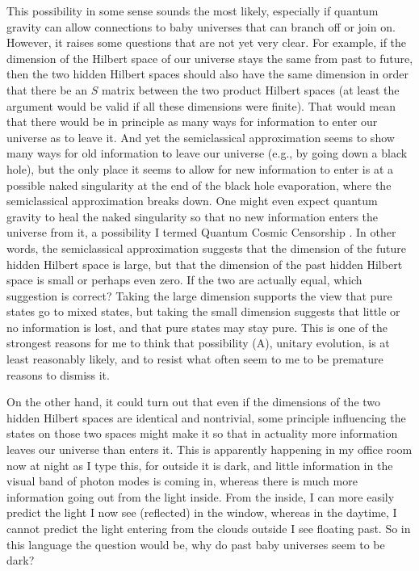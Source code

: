 \documentclass[12pt]{article}
\begin{document}
     This possibility in some sense sounds the most likely,
especially if
quantum gravity can allow connections to baby universes that can
branch off or
join on.  However, it raises some questions that are not yet very
clear.  For
example, if the dimension of the Hilbert space of our universe stays
the same
from past to future, then the two hidden Hilbert spaces should also
have the
same dimension in order that there be an $S$ matrix between the two
product
Hilbert spaces (at least the argument would be valid if all these
dimensions
were finite).  That would mean that there would be in principle as
many ways
for information to enter our universe as to leave it.  And yet the
semiclassical approximation seems to show many ways for old
information to
leave our universe (e.g., by going down a black hole), but the only
place it
seems to allow for new information to enter is at a possible naked
singularity
at the end of the black hole evaporation, where the semiclassical
approximation
breaks down.  One might even expect quantum gravity to heal the naked
singularity so that no new information enters the universe from it, a
possibility
I termed Quantum Cosmic Censorship \cite{Pag80}.  In other
words, the semiclassical approximation suggests that the dimension of
the
future hidden Hilbert space is large, but that the dimension of the
past hidden
Hilbert space is small or perhaps even zero.  If the two are actually
equal,
which suggestion is correct?  Taking the large dimension supports the
view that
pure states go to mixed states, but taking the small dimension
suggests that
little or no information is lost, and that pure states may stay pure.
This is
one of the strongest reasons for me to think that possibility (A),
unitary
evolution, is at least reasonably likely, and to resist what often
seem to me
to be premature reasons to dismiss it.

     On the other hand, it could turn out that even if the dimensions
of the
two hidden Hilbert spaces are identical and nontrivial, some
principle
influencing the states on those two spaces might make it so that in
actuality
more information leaves our universe than enters it.  This is
apparently
happening in my office room now at night as I type this, for outside
it is
dark, and little information in the visual band of photon modes is
coming in,
whereas there is much more information going out from the light
inside.  From
the inside, I can more easily predict the light I now see (reflected)
in the
window, whereas in the daytime, I cannot predict the light entering
from the
clouds outside I see floating past.  So in this language the question
would be,
why do past baby universes seem to be dark?
\end{document}

